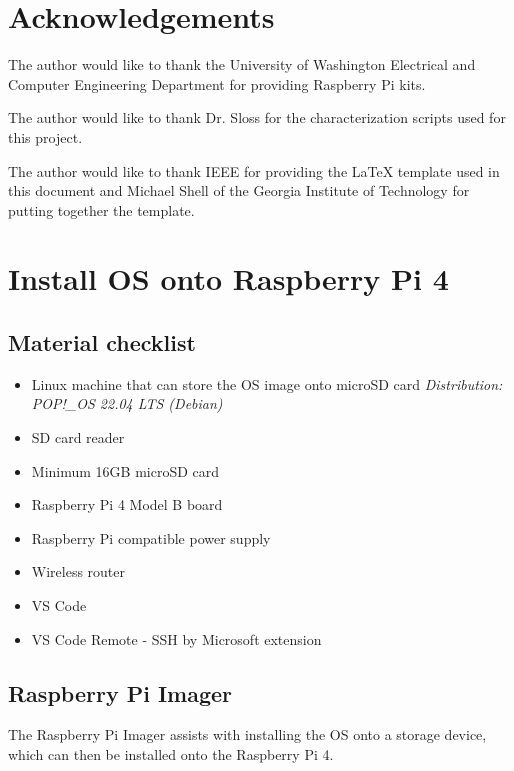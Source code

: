 \documentclass[journal]{IEEEtran}
\begin{document}
    \nocite{*}
    \newpage

    
    

    \newpage
    \section{Acknowledgements}
    The author would like to thank the University of Washington Electrical and Computer Engineering Department for providing Raspberry Pi kits.
    
    The author would like to thank Dr. Sloss for the characterization scripts used for this project.

    The author would like to thank IEEE for providing the LaTeX template used in this document and Michael Shell of the Georgia Institute of Technology for putting together the template.

    \appendices
    \section{Install OS onto Raspberry Pi 4}
    \subsection{Material checklist}        
    \begin{itemize}
        \item Linux machine that can store the OS image onto microSD card \newline
            \emph{Distribution: POP!\_OS 22.04 LTS (Debian)}
        \item SD card reader
        \item Minimum 16GB microSD card
        \item Raspberry Pi 4 Model B board
        \item Raspberry Pi compatible power supply
        \item Wireless router
        \item VS Code
        \item VS Code Remote - SSH by Microsoft extension
    \end{itemize}

    \subsection{Raspberry Pi Imager}

    The Raspberry Pi Imager assists with installing the OS onto a storage device, which can then be installed onto the Raspberry Pi 4.
\end{document}
